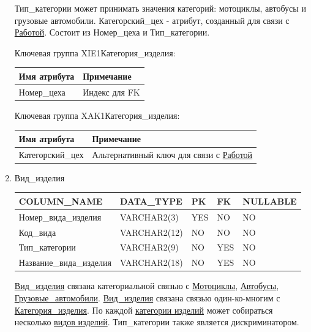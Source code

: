 \begin{enumerate}
    Тип\_категории может принимать значения категорий: мотоциклы, автобусы и грузовые автомобили.
    Категорский\_цех - атрибут, созданный для связи с \underline{Работой}. Состоит из Номер\_цеха и Тип\_категории.

    Ключевая группа XIE1Категория\_изделия:

    \begin{tabular}{|p{7cm}|p{9.3cm}|} \hline

        {\bf Имя атрибута} & {\bf Примечание} \\ \hline
        Номер\_цеха & Индекс для FK \\ \hline

    \end{tabular}

    Ключевая группа XAK1Категория\_изделия:

    \begin{tabular}{|p{7cm}|p{9.3cm}|} \hline

        {\bf Имя атрибута} & {\bf Примечание} \\ \hline
        Категорский\_цех & Альтернативный ключ для связи с \underline{Работой} \\ \hline

    \end{tabular}

    \item{Вид\_изделия}

    \begin{tabular}{|p{7cm}|p{3cm}|p{1cm}|p{1cm}|p{3cm}|} \hline

        {\bf COLUMN\_NAME} & {\bf DATA\_TYPE} & {\bf PK} & {\bf FK} & {\bf NULLABLE} \\ \hline
        Номер\_вида\_изделия & VARCHAR2(3) & YES & NO & NO \\ \hline
        Код\_вида & VARCHAR2(12) & NO & NO & NO \\ \hline
        Тип\_категории & VARCHAR2(9) & NO & YES & NO \\ \hline
        Название\_вида\_изделия & VARCHAR2(18) & NO & YES & NO \\ \hline

    \end{tabular}

    \underline{Вид\_изделия} связана категориальной связью с \underline{Мотоциклы}, \underline{Автобусы}, \underline{Грузовые\_автомобили}.
    \underline{Вид\_изделия} связана связью один-ко-многим с \underline{Категория\_изделия}.
    По каждой \underline{категории изделий} может собираться несколько \underline{видов изделий}.
    Тип\_категории также является дискриминатором.


\end{enumerate}
